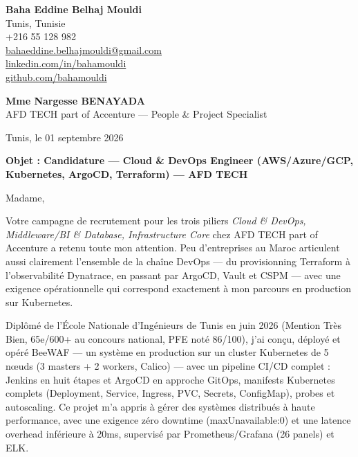\documentclass[a4paper,11pt]{article}
\begin{document}
\begin{flushright}
{\bfseries Baha Eddine Belhaj Mouldi}\\
Tunis, Tunisie\\
+216 55 128 982\\
\href{mailto:bahaeddine.belhajmouldi@gmail.com}{bahaeddine.belhajmouldi@gmail.com}\\
\href{https://linkedin.com/in/bahamouldi}{linkedin.com/in/bahamouldi}\\
\href{https://github.com/bahamouldi}{github.com/bahamouldi}
\end{flushright}

\vspace{0.8cm}

\begin{flushleft}
{\bfseries Mme Nargesse BENAYADA}\\
AFD TECH part of Accenture — People \& Project Specialist

\vspace{0.8cm}

Tunis, le 01 septembre 2026

\vspace{0.6cm}

{\bfseries Objet : Candidature — Cloud \& DevOps Engineer (AWS/Azure/GCP, Kubernetes, ArgoCD, Terraform) — AFD TECH}
\end{flushleft}

\vspace{0.6cm}

Madame,

Votre campagne de recrutement pour les trois piliers \textit{Cloud \& DevOps, Middleware/BI \& Database, Infrastructure Core} chez AFD TECH part of Accenture a retenu toute mon attention. Peu d'entreprises au Maroc articulent aussi clairement l'ensemble de la chaîne DevOps — du provisionning Terraform à l'observabilité Dynatrace, en passant par ArgoCD, Vault et CSPM — avec une exigence opérationnelle qui correspond exactement à mon parcours en production sur Kubernetes.

Diplômé de l'École Nationale d'Ingénieurs de Tunis en juin 2026 (Mention Très Bien, 65e/600+ au concours national, PFE noté 86/100), j'ai conçu, déployé et opéré BeeWAF — un système en production sur un cluster Kubernetes de 5 nœuds (3 masters + 2 workers, Calico) — avec un pipeline CI/CD complet : Jenkins en huit étapes et ArgoCD en approche GitOps, manifests Kubernetes complets (Deployment, Service, Ingress, PVC, Secrets, ConfigMap), probes et autoscaling. Ce projet m'a appris à gérer des systèmes distribués à haute performance, avec une exigence zéro downtime (maxUnavailable:0) et une latence overhead inférieure à 20ms, supervisé par Prometheus/Grafana (26 panels) et ELK.
\end{document}
